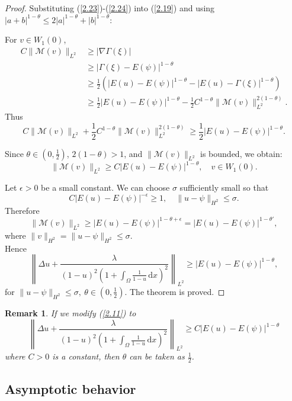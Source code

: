 \documentclass{article}
\numberwithin{equation}{section}
\newtheorem{remark}{Remark}[section]
\begin{document}
\begin{proof}
    Substituting (\ref{2.23})-(\ref{2.24}) into (\ref{2.19}) and using $|a+b|^{1-\theta}\le 2|a|^{1-\theta}+|b|^{1-\theta}$:

    For $v\in W_1(0)$,
    \begin{align*}
        C\|\mathcal{M}(v)\|_{L^{2}}&\ge |\nabla\Gamma(\xi)|\\
        &\ge |\Gamma(\xi)-E(\psi)|^{1-\theta}\\
        &\ge \frac{1}{2}\left(|E(u)-E(\psi)|^{1-\theta}-|E(u)-\Gamma(\xi)|^{1-\theta}\right)\\
        &\ge \frac{1}{2}|E(u)-E(\psi)|^{1-\theta}-\frac{1}{2}C^{1-\theta}\|\mathcal{M}(v)\|_{L^{2}}^{2(1-\theta)}.
    \end{align*}
    Thus
    $$C\|\mathcal{M}(v)\|_{L^{2}}+\frac{1}{2}C^{1-\theta}\|\mathcal{M}(v)\|_{L^{2}}^{2(1-\theta)}\ge \frac{1}{2}|E(u)-E(\psi)|^{1-\theta}.$$

    Since $\theta\in (0,\frac{1}{2})$, $2(1-\theta)> 1$, and $\|\mathcal{M}(v)\|_{L^{2}}$ is bounded, we obtain:
    $$\|\mathcal{M}(v)\|_{L^{2}}\ge C|E(u)-E(\psi)|^{1-\theta},\quad v\in W_1(0).$$

    Let $\epsilon>0$ be a small constant. We can choose $\sigma$ sufficiently small so that
    $$C|E(u)-E(\psi)|^{-\epsilon}\ge 1,\quad \|u-\psi\|_{H^2}\le \sigma.$$
    Therefore
    $$\|\mathcal{M}(v)\|_{L^{2}}\ge |E(u)-E(\psi)|^{1-\theta+\epsilon}=|E(u)-E(\psi)|^{1-\theta'},$$
    where $\|v\|_{H^2}=\|u-\psi\|_{H^2}\le \sigma$.\\
    Hence
    $$\left\|\Delta u+\frac{\lambda}{(1-u)^2(1+\int_{\Omega}\frac{1}{1-u}\,\mathrm{d}x)^2}\right\|_{L^{2}}\ge |E(u)-E(\psi)|^{1-\theta},$$
    for $\|u-\psi\|_{H^2}\le \sigma,\ \theta\in (0,\frac{1}{2})$. The theorem is proved.
\end{proof}

\begin{remark}\label{remark2.1}
    If we modify (\ref{2.11}) to
    \begin{equation}
        \left\|\Delta u+\frac{\lambda}{(1-u)^2(1+\int_{\Omega}\frac{1}{1-u}\,\mathrm{d}x)^2}\right\|_{L^{2}}\ge C|E(u)-E(\psi)|^{1-\theta}\label{2.25}
    \end{equation}
    where $C>0$ is a constant, then $\theta$ can be taken as $\frac{1}{2}$.
\end{remark}

\subsection{Asymptotic behavior}
\end{document}
